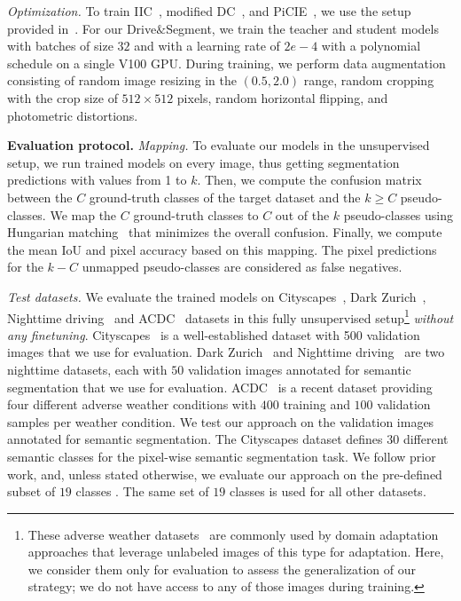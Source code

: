 \documentclass[runningheads]{llncs}
\newcommand{\ours}{Drive$\&$Segment\xspace}
\newcommand{\paragraphcustom}[1]{\smallskip\noindent\textbf{#1}}
\begin{document}
\emph{Optimization.} To train IIC~\cite{ji2019invariant}, modified DC~\cite{caron2018deep}, and PiCIE~\cite{cho2021picie}, we use the setup provided in~\cite{cho2021picie}.
For our \ours, we train the teacher and student models 
with batches of size $32$ and with a learning rate of $2e{-}4$ with a polynomial schedule on a single 
V100 GPU. 
During training, we perform data augmentation consisting of random image resizing in the $\left(0.5, 2.0\right)$ range, random cropping with the crop size of $512\times 512$ pixels, random horizontal flipping, and photometric distortions.


\paragraphcustom{Evaluation protocol.}
\label{sec:evaluation_protocol}
\emph{Mapping.} To evaluate our models in the unsupervised setup, we run trained models on every image, thus getting segmentation predictions with values from 1 to $k$.  Then, we compute the confusion matrix between the $C$ ground-truth classes of the target dataset and the $k\ge C$ pseudo-classes. We map the $C$ ground-truth classes to $C$ out of the $k$ pseudo-classes using Hungarian matching~\cite{Kuhn1955thehungarian} that minimizes the overall confusion. Finally, we compute the 
mean IoU and pixel accuracy based on this mapping. The pixel predictions for the $k-C$ unmapped pseudo-classes are considered as false negatives.

\emph{Test datasets.}
We evaluate the trained models on Cityscapes~\cite{Cordts2016Cityscapes},  Dark Zurich~\cite{SDV20}, Nighttime driving~\cite{daytime:2:nighttime} and ACDC~\cite{SDV21} datasets in this fully unsupervised setup\footnote{ These adverse weather datasets~\cite{daytime:2:nighttime,SDV20,SDV21} are commonly used by domain adaptation approaches that leverage unlabeled images of this type for adaptation. Here, we consider them only for evaluation to assess the generalization of our strategy; we do not have access to any of those images during training.} \emph{without any finetuning}. Cityscapes~\cite{Cordts2016Cityscapes} is a well-established dataset 
with 500 validation images that we use for evaluation. Dark Zurich~\cite{SDV20} and Nighttime driving~\cite{daytime:2:nighttime} are two nighttime datasets, each with $50$ validation images annotated for semantic segmentation that we use for evaluation. ACDC~\cite{SDV21} is a recent dataset providing four different adverse weather conditions with $400$ training and $100$ validation samples per weather condition. We test our approach on the validation images annotated for semantic segmentation. The Cityscapes dataset defines $30$ different semantic classes for the pixel-wise semantic segmentation task. We follow prior work, and, unless stated otherwise, we evaluate our approach on the pre-defined subset of $19$ classes \cite{Cordts2016Cityscapes}. The same set of $19$ classes is used for all other datasets.
\end{document}
